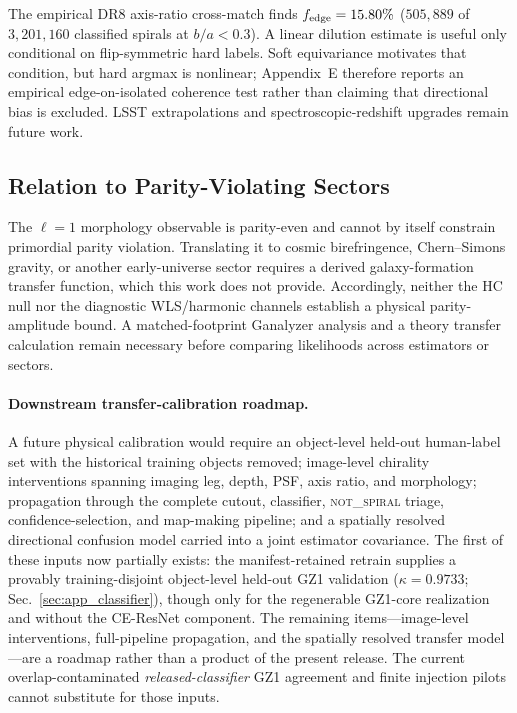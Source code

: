 \documentclass[twocolumn,linenumbers]{aastex702}
\newcommand{\NS}{\textsc{not\_spiral}}
\begin{document}
The empirical DR8 axis-ratio cross-match finds $f_{\rm edge}=15.80\%$ ($505{,}889$ of $3{,}201{,}160$ classified spirals at $b/a<0.3$). A linear dilution estimate is useful only conditional on flip-symmetric hard labels. Soft equivariance motivates that condition, but hard argmax is nonlinear; Appendix~E therefore reports an empirical edge-on-isolated coherence test rather than claiming that directional bias is excluded. LSST extrapolations and spectroscopic-redshift upgrades remain future work.

\subsection{Relation to Parity-Violating Sectors}
\label{sec:parity_translation}

The $\ell=1$ morphology observable is parity-even and cannot by itself constrain primordial parity violation. Translating it to cosmic birefringence, Chern--Simons gravity, or another early-universe sector requires a derived galaxy-formation transfer function, which this work does not provide. Accordingly, neither the HC null nor the diagnostic WLS/harmonic channels establish a physical parity-amplitude bound. A matched-footprint Ganalyzer analysis and a theory transfer calculation remain necessary before comparing likelihoods across estimators or sectors.

\paragraph{Downstream transfer-calibration roadmap.}
A future physical calibration would require an object-level held-out human-label set with the historical training objects removed; image-level chirality interventions spanning imaging leg, depth, PSF, axis ratio, and morphology; propagation through the complete cutout, classifier, \NS{} triage, confidence-selection, and map-making pipeline; and a spatially resolved directional confusion model carried into a joint estimator covariance. The first of these inputs now partially exists: the manifest-retained retrain supplies a provably training-disjoint object-level held-out GZ1 validation ($\kappa=0.9733$; Sec.~\ref{sec:app_classifier}), though only for the regenerable GZ1-core realization and without the CE-ResNet component. The remaining items---image-level interventions, full-pipeline propagation, and the spatially resolved transfer model---are a roadmap rather than a product of the present release. The current overlap-contaminated \emph{released-classifier} GZ1 agreement and finite injection pilots cannot substitute for those inputs.
\end{document}
